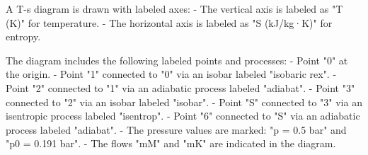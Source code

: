 A T-s diagram is drawn with labeled axes:  
- The vertical axis is labeled as "T (K)" for temperature.  
- The horizontal axis is labeled as "S (kJ/kg·K)" for entropy.  

The diagram includes the following labeled points and processes:  
- Point "0" at the origin.  
- Point "1" connected to "0" via an isobar labeled "isobaric rex".  
- Point "2" connected to "1" via an adiabatic process labeled "adiabat".  
- Point "3" connected to "2" via an isobar labeled "isobar".  
- Point "S" connected to "3" via an isentropic process labeled "isentrop".  
- Point "6" connected to "S" via an adiabatic process labeled "adiabat".  
- The pressure values are marked: "p = 0.5 bar" and "p0 = 0.191 bar".  
- The flows "mM" and "mK" are indicated in the diagram.